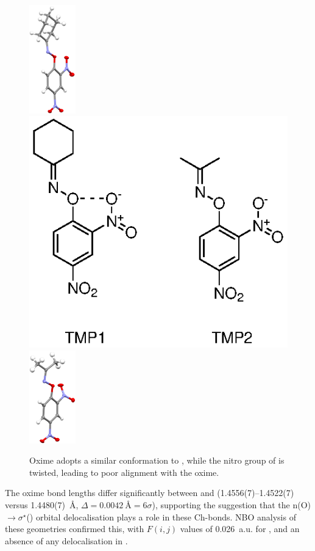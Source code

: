 \begin{refsection}
\begin{figure}
	\centering
	\includegraphics[width=2cm]{Figures/cyclohexanone-oxime-dnp-xray.pdf}
	\includegraphics[scale=0.8]{Figures/oximes.eps}
	\includegraphics[width=2cm]{Figures/acetone-oxime-dnp-xray.pdf}
	\caption{Oxime  adopts a similar conformation to , while the nitro group of  is twisted, leading to poor alignment with the oxime.}
	\label{fig:analogues}
\end{figure}

The oxime bond lengths differ significantly between  and  (1.4556(7)--1.4522(7) versus 1.4480(7)~\AA, $\Delta = 0.0042~\text{\AA} = 6\sigma$), supporting the suggestion that the n(O)$\rightarrow \sigma^{\star}$() orbital delocalisation plays a role in these Ch-bonds.
NBO analysis of these geometries confirmed this, with $F(i,j)$ values of 0.026~a.u. for , and an absence of any delocalisation in .


\end{refsection}
